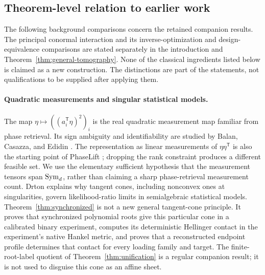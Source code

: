 \subsection{Theorem-level relation to earlier work}
The following background comparisons concern the retained companion results. The principal conormal interaction and its inverse-optimization and design-equivalence comparisons are stated separately in the introduction and Theorem~\ref{thm:general-tomography}. None of the classical ingredients listed below is claimed as a new construction. The distinctions are part of the statements, not qualifications to be supplied after applying them.

\paragraph{Quadratic measurements and singular statistical models.}
The map $\eta\mapsto((a_i^{\mathsf T}\eta)^2)_i$ is the real quadratic measurement map familiar from phase retrieval. Its sign ambiguity and identifiability are studied by Balan, Casazza, and Edidin \cite{BCE}. The representation as linear measurements of $\eta\eta^{\mathsf T}$ is also the starting point of PhaseLift \cite{CSV}; dropping the rank constraint produces a different feasible set. We use the elementary sufficient hypothesis that the measurement tensors span $\operatorname{Sym}_d$, rather than claiming a sharp phase-retrieval measurement count. Drton \cite{Drton} explains why tangent cones, including nonconvex ones at singularities, govern likelihood-ratio limits in semialgebraic statistical models. Theorem~\ref{thm:synchronized} is not a new general tangent-cone principle. It proves that synchronized polynomial roots give this particular cone in a calibrated binary experiment, computes its deterministic Hellinger contact in the experiment's native Hankel metric, and proves that a reconstructed endpoint profile determines that contact for every loading family and target. The finite-root-label quotient of Theorem~\ref{thm:unification} is a regular companion result; it is not used to disguise this cone as an affine sheet.


